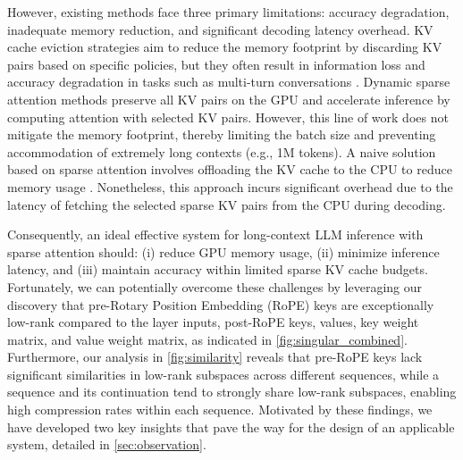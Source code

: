 However, existing methods face three primary limitations: accuracy degradation, inadequate memory reduction, and significant decoding latency overhead. KV cache eviction strategies \citep{zhang2024h2o, zhang2024pyramidkv} aim to reduce the memory footprint by discarding KV pairs based on specific policies, but they often result in information loss and accuracy degradation in tasks such as multi-turn conversations \citep{yang2024no, tang2024razorattention}. Dynamic sparse attention methods \citep{tang2024quest} preserve all KV pairs on the GPU and accelerate inference by computing attention with selected KV pairs. However, this line of work does not mitigate the memory footprint, thereby limiting the batch size and preventing accommodation of extremely long contexts (e.g., 1M tokens). A naive solution based on sparse attention involves offloading the KV cache to the CPU to reduce memory usage \citep{lee-osdi24, he2024fastdecode}. Nonetheless, this approach incurs significant overhead due to the latency of fetching the selected sparse KV pairs from the CPU during decoding.

Consequently, an ideal effective system for long-context LLM inference with sparse attention should: (i) reduce GPU memory usage, (ii) minimize inference latency, and (iii) maintain accuracy within limited sparse KV cache budgets. Fortunately, we can potentially overcome these challenges by leveraging our discovery that pre-Rotary Position Embedding \citep{su2024roformer} (RoPE) keys are exceptionally low-rank compared to the layer inputs, post-RoPE keys, values, key weight matrix, and value weight matrix, as indicated in \cref{fig:singular_combined}. Furthermore, our analysis in \cref{fig:similarity} reveals that pre-RoPE keys lack significant similarities in low-rank subspaces across different sequences, while a sequence and its continuation tend to strongly share low-rank subspaces, enabling high compression rates within each sequence. Motivated by these findings, we have developed two key insights that pave the way for  the design of an applicable system, detailed in \cref{sec:observation}.


